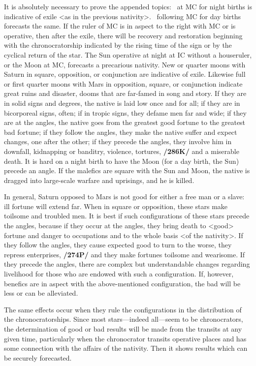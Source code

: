 It is absolutely necessary to prove the appended topics: \Saturn\, at MC for night births is indicative of exile <as in the previous nativity>. \Mars\, following MC for day births forecasts the same. If the ruler of MC is in aspect to the right with MC or is operative, then after the exile, there will be recovery and
restoration beginning with the chronocratorship indicated by the rising time of the sign or by the cyclical return of the star. The Sun operative at night at IC without a houseruler, or the Moon at MC, forecasts a precarious nativity. New or quarter moons with Saturn in square, opposition, or conjunction are indicative of exile. Likewise full or first quarter moons with Mars in opposition, square, or conjunction indicate great ruins and disaster, dooms that are far-famed in song and story. If they are in solid signs and degrees, the native is laid low once and for all; if they are in bicorporeal signs, often; if in tropic signs, they defame men far and wide; if they are at the angles, the native goes from the greatest good fortune to the greatest bad fortune; if they follow the angles, they make the native suffer and expect changes, one after the other; if they precede the angles, they involve him in downfall, kidnapping or banditry, violence, tortures, \textbf{/286K/} and a miserable death. It is hard on a night birth to have the Moon (for a day birth, the Sun) precede an angle. If the malefics are square with the Sun and Moon, the native is dragged into large-scale warfare and uprisings, and he is killed.

In \mndl general, Saturn opposed to Mars is not good for either a free man or a slave: ill fortune will extend far. When in square or opposition, these stars make toilsome and troubled men. It is best if such configurations of these stars precede the angles, because if they occur at the angles, they bring death to <good> fortune and danger to occupations and to the whole basis <of the nativity>. If they follow the angles, they cause expected good to turn to the worse, they repress enterprises, \textbf{/274P/} and they make fortunes toilsome and wearisome. If they precede the angles, there are complex but understandable changes regarding livelihood for those who are endowed with such a configuration. If, however, benefics are in aspect with the above-mentioned configuration, the bad will be less or can be alleviated.

The \mnt same effects occur when they rule the configurations in the distribution of the chronocratorships. Since most stars—indeed all—seem to be chronocrators, the determination of good or bad results will be made from the transits at any given time, particularly when the chronocrator transits operative places and has some connection with the affairs of the nativity. Then it shows results which can be securely
forecasted.

